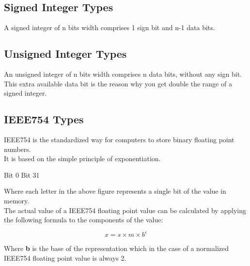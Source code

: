 \color{type_class_sint}
\subsection{Signed Integer Types} \label{subsec:signed-integer-types}
\color{secondary_fg}
A signed integer of n bits width comprises 1 sign bit and n-1 data bits.

\color{type_class_uint}
\subsection{Unsigned Integer Types} \label{subsec:unsigned-integer-types}
\color{secondary_fg}
An unsigned integer of n bits width comprises n data bits, without any sign bit.\\
This extra available data bit is the reason why you get double the range of a
signed integer.

\color{type_class_ieee}
\subsection{IEEE754 Types} \label{subsec:ieee754-types}
\color{secondary_fg}
IEEE754 is the standardized way for computers to store binary floating point numbers.\\
It is based on the simple principle of exponentiation.

\begin{center}
    Bit 0
    Bit 31
\end{center}

\noindent
Where each letter in the above figure represents a single bit of the value in memory.\\
The actual value of a IEEE754 floating point value can be calculated by applying the
following formula to the components of the value:

\begin{center}
    \fontsize{18}{0} \selectfont
    \begin{equation*}
        x=s \times m \times b^e
    \end{equation*}
    \normalfont \selectfont
\end{center}

\noindent
Where \textbf{b} is the base of the representation which in the case of
a normalized IEEE754 floating point value is always 2.

